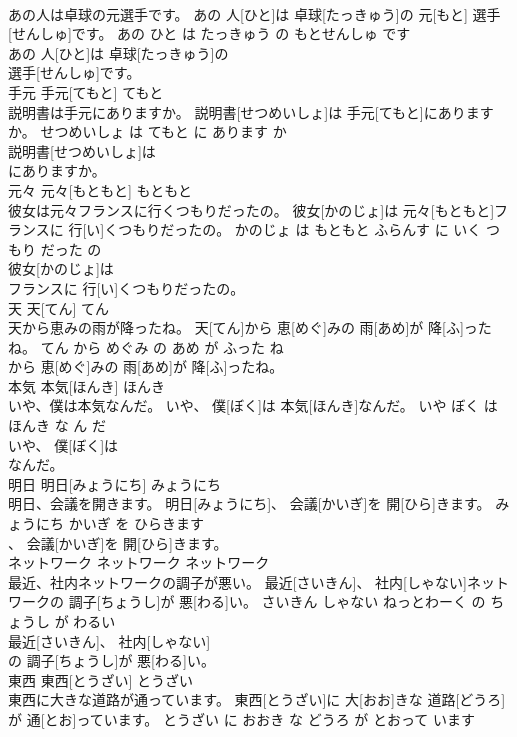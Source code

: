 \documentclass[8pt]{extreport}
\begin{document}
\begin{CJK}{UTF8}{min}
\\	あの人は卓球の元選手です。	あの 人[ひと]は 卓球[たっきゅう]の 元[もと] 選手[せんしゅ]です。	あの ひと は たっきゅう の もとせんしゅ です	
\\	あの 人[ひと]は 卓球[たっきゅう]の
\\	選手[せんしゅ]です。			
\\	手元	手元[てもと]	てもと	
\\	説明書は手元にありますか。	説明書[せつめいしょ]は 手元[てもと]にありますか。	せつめいしょ は てもと に あります か	
\\	説明書[せつめいしょ]は
\\	にありますか。			
\\	元々	元々[もともと]	もともと	
\\	彼女は元々フランスに行くつもりだったの。	彼女[かのじょ]は 元々[もともと]フランスに 行[い]くつもりだったの。	かのじょ は もともと ふらんす に いく つもり だった の	
\\	彼女[かのじょ]は
\\	フランスに 行[い]くつもりだったの。			
\\	天	天[てん]	てん	
\\	天から恵みの雨が降ったね。	天[てん]から 恵[めぐ]みの 雨[あめ]が 降[ふ]ったね。	てん から めぐみ の あめ が ふった ね	
\\	から 恵[めぐ]みの 雨[あめ]が 降[ふ]ったね。			
\\	本気	本気[ほんき]	ほんき	
\\	いや、僕は本気なんだ。	いや、 僕[ぼく]は 本気[ほんき]なんだ。	いや ぼく は ほんき な ん だ	
\\	いや、 僕[ぼく]は
\\	なんだ。			
\\	明日	明日[みょうにち]	みょうにち	
\\	明日、会議を開きます。	明日[みょうにち]、 会議[かいぎ]を 開[ひら]きます。	みょうにち かいぎ を ひらきます	
\\	、 会議[かいぎ]を 開[ひら]きます。			
\\	ネットワーク	ネットワーク	ネットワーク	
\\	最近、社内ネットワークの調子が悪い。	最近[さいきん]、 社内[しゃない]ネットワークの 調子[ちょうし]が 悪[わる]い。	さいきん しゃない ねっとわーく の ちょうし が わるい	
\\	最近[さいきん]、 社内[しゃない]
\\	の 調子[ちょうし]が 悪[わる]い。			
\\	東西	東西[とうざい]	とうざい	
\\	東西に大きな道路が通っています。	東西[とうざい]に 大[おお]きな 道路[どうろ]が 通[とお]っています。	とうざい に おおき な どうろ が とおって います	

\end{CJK}
\end{document}
